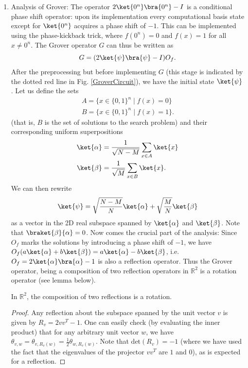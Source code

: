 \begin{enumerate}
    \item Analysis of Grover:
    The operator $2\ket{0^n}\bra{0^n}-I$ is a conditional phase shift operator: upon its implementation every computational basis state except for $\ket{0^n}$ acquires a phase shift of $-1$. This can be implemented using the phase-kickback trick, where $f(0^n)=0$ and $f(x)=1$ for all $x \neq 0^n$. The Grover operator $G$ can thus be written as
    \[
        G = (2\ket{\psi}\bra{\psi}-I)O_f.
    \]
    After the preprocessing but before implementing $G$ (this stage is indicated by the dotted red line in Fig. \ref{GroverCircuit}), we have the initial state $\ket{\psi}$. Let us define the sets 
    \begin{align*}
        A = \{x \in \{0,1\}^n \;|\; f(x)=0\}\\
        B = \{x \in \{0,1\}^n \;|\; f(x)=1\}.
    \end{align*}
    (that is, $B$ is the set of solutions to the search problem) and their corresponding uniform superpositions
    \begin{align*}
        \ket{\alpha} &= \frac{1}{\sqrt{N-M}} \sum_{x \in A} \ket{x}\\
        \ket{\beta} &= \frac{1}{\sqrt{M}} \sum_{x \in B} \ket{x}.
    \end{align*}
    We can then rewrite
    \[
        \ket{\psi} = \sqrt{\frac{N-M}{N}}\ket{\alpha} + \sqrt{\frac{M}{N}}\ket{\beta}  
    \]
    as a vector in the 2D real subspace spanned by $\ket{\alpha}$ and $\ket{\beta}$. Note that $\braket{\beta}{\alpha}=0$. Now comes the crucial part of the analysis: Since $O_f$ marks the solutions by introducing a phase shift of $-1$, we have $O_f(a\ket{\alpha}+b\ket{\beta}) = a\ket{\alpha}-b\ket{\beta}$, i.e. $O_f = 2\ket{\alpha}\bra{\alpha}-1$ is also a reflection operator. Thus the Grover operator, being a composition of two reflection operators in $\mathbb{R}^2$ is a rotation operator (see lemma below).

    \begin{lemma}
        In $\mathbb{R}^2$, the composition of two reflections is a rotation.
    \end{lemma}
    \begin{proof}
        Any reflection about the subspace spanned by the unit vector $v$ is given by $R_v = 2vv^T-1$. One can easily check (by evaluating the inner product) that for any arbitrary unit vector $w$, we have $\theta_{v,w} = \theta_{v,R_v(w)} = \frac{1}{2}\theta_{w,R_v(w)}$. Note that $\text{det}(R_v) = -1$ (where we have used the fact that the eigenvalues of the projector $vv^T$ are $1$ and $0$), as is expected for a reflection.


\end{proof}
\end{enumerate}
